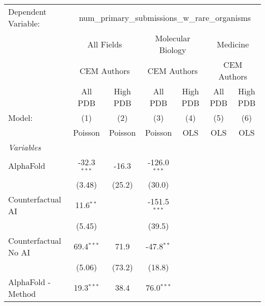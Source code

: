 \begingroup
\centering
\begin{tabular}{lcccccc}
   \tabularnewline \midrule \midrule
   Dependent Variable: & \multicolumn{6}{c}{num\_primary\_submissions\_w\_rare\_organisms}\\
 & \multicolumn{2}{c}{All Fields} & \multicolumn{2}{c}{Molecular Biology} & \multicolumn{2}{c}{Medicine} \\
\cmidrule(lr){2-3} \cmidrule(lr){4-5} \cmidrule(lr){6-7}
 & \multicolumn{2}{c}{CEM Authors} & \multicolumn{2}{c}{CEM Authors} & \multicolumn{2}{c}{CEM Authors} \\
\cmidrule(lr){2-3} \cmidrule(lr){4-5} \cmidrule(lr){6-7}
 & \multicolumn{1}{c}{All PDB} & \multicolumn{1}{c}{High PDB} & \multicolumn{1}{c}{All PDB} & \multicolumn{1}{c}{High PDB} & \multicolumn{1}{c}{All PDB} & \multicolumn{1}{c}{High PDB} \\
\cmidrule(lr){2-2} \cmidrule(lr){3-3} \cmidrule(lr){4-4} \cmidrule(lr){5-5} \cmidrule(lr){6-6} \cmidrule(lr){7-7}
   Model:                                                     & (1)              & (2)         & (3)            & (4)  & (5)  & (6)\\  
                                                              &  Poisson         & Poisson     & Poisson        & OLS  & OLS  & OLS\\  
   \midrule
   \emph{Variables}\\
   AlphaFold                                                  & -32.3$^{***}$    & -16.3       & -126.0$^{***}$ &      &      &   \\   
                                                              & (3.48)           & (25.2)      & (30.0)         &      &      &   \\   
   Counterfactual AI                                          & 11.6$^{**}$      &             & -151.5$^{***}$ &      &      &   \\   
                                                              & (5.45)           &             & (39.5)         &      &      &   \\   
   Counterfactual No AI                                       & 69.4$^{***}$     & 71.9        & -47.8$^{**}$   &      &      &   \\   
                                                              & (5.06)           & (73.2)      & (18.8)         &      &      &   \\   
   AlphaFold - Method                                         & 19.3$^{***}$     & 38.4        & 76.0$^{***}$   &      &      &   \\   

\end{tabular}
